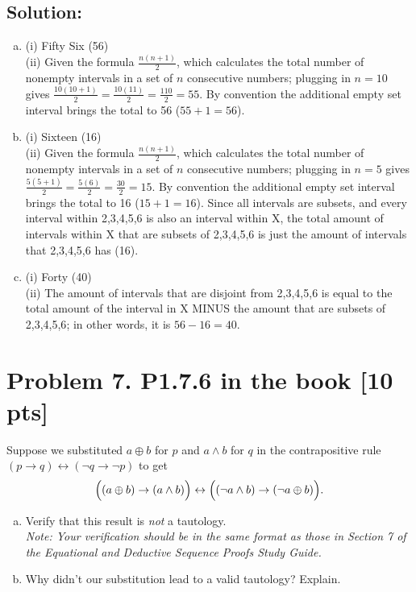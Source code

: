 \documentclass[12pt]{article}
\begin{document}
	\subsection*{\textbf{Solution:}}
	\begin{enumerate}[(a)]
		\item (i) Fifty Six (56) \\
			(ii) Given the formula $\frac{n(n+1)}{2}$, which calculates the total
			number of nonempty intervals in a set of $n$ consecutive numbers; plugging
			in $n=10$ gives $\frac{10(10+1)}{2}=\frac{10(11)}{2}=\frac{110}{2}=55$. By
			convention the additional empty set interval brings the total to 56 ($55+1=
			56$).

		\item (i) Sixteen (16) \\
			(ii) Given the formula $\frac{n(n+1)}{2}$, which calculates the total
			number of nonempty intervals in a set of $n$ consecutive numbers; plugging
			in $n=5$ gives $\frac{5(5+1)}{2}=\frac{5(6)}{2}=\frac{30}{2}=15$. By
			convention the additional empty set interval brings the total to 16 ($15+1=
			16$). Since all intervals are subsets, and every interval within
			{2,3,4,5,6} is also an interval within X, the total amount of intervals within
			X that are subsets of {2,3,4,5,6} is just the amount of intervals that {2,3,4,5,6}
			has (16).

		\item (i) Forty (40) \\
			(ii) The amount of intervals that are disjoint from {2,3,4,5,6} is equal to
			the total amount of the interval in X MINUS the amount that are subsets of
			{2,3,4,5,6}; in other words, it is $56-16=40$.
	\end{enumerate}

	\newpage
	\section*{\textbf{Problem 7. P1.7.6 in the book} [10 pts]}
	Suppose we substituted $a \oplus b$ for $p$ and $a \land b$ for $q$ in the contrapositive
	rule $(p \rightarrow q) \leftrightarrow (\neg q \rightarrow \neg p)$ to get
	\[
		\Bigl((a \oplus b) \rightarrow (a \land b)\Bigr) \leftrightarrow \Bigl((\neg
		a \land b) \rightarrow (\neg a \oplus b)\Bigr).
	\]

	\begin{enumerate}[(a)]
		\item Verify that this result is \textit{not} a tautology.\\
			{\em \small Note: Your verification should be in the same format as those in Section 7 of the Equational and Deductive Sequence Proofs Study Guide.}

		\item Why didn’t our substitution lead to a valid tautology? Explain.
	\end{enumerate}
\end{document}
